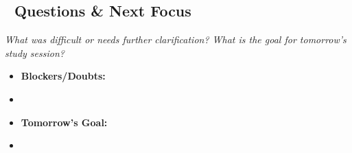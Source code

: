 \subsection{🧠 Questions \& Next Focus}
\textit{What was difficult or needs further clarification? What is the goal for tomorrow's study session?}

\begin{itemize}
  \item \textbf{Blockers/Doubts:}
  \item 
  \item \textbf{Tomorrow's Goal:}
  \item 

\end{itemize}